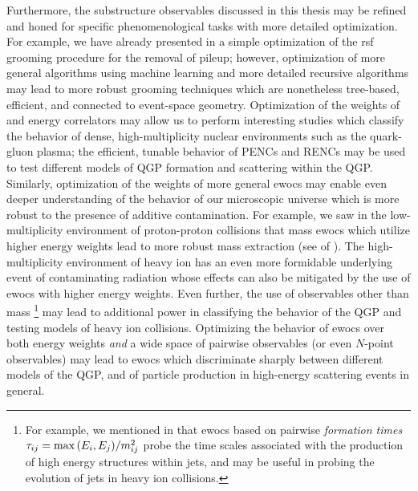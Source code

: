 Furthermore, the substructure observables discussed in this thesis may be refined and honed for specific phenomenological tasks with more detailed optimization.
%
For example, we have already presented in  a simple optimization of the \gls{rsf} \PIRANHA{} grooming procedure for the removal of pileup;
%
however, optimization of more general  algorithms using machine learning and more detailed recursive algorithms may lead to more robust \PIRANHA{} grooming techniques which are nonetheless tree-based, efficient, and connected to event-space geometry.
%
Optimization of the weights of  and  energy correlators may allow us to perform interesting studies which classify the behavior of dense, high-multiplicity nuclear environments such as the quark-gluon plasma;
%
the efficient, tunable behavior of PENCs and RENCs may be used to test different models of QGP formation and scattering within the QGP.
%
Similarly, optimization of the weights of more general \glspl{ewoc} may enable even deeper understanding of the behavior of our microscopic universe which is more robust to the presence of additive contamination.
%
For example, we saw in the low-multiplicity environment of proton-proton collisions that mass \glspl{ewoc} which utilize higher energy weights lead to more robust mass extraction (see  of ).
%
The high-multiplicity environment of heavy ion has an even more formidable underlying event of contaminating radiation whose effects can also be mitigated by the use of \glspl{ewoc} with higher energy weights.
%
Even further, the use of observables other than mass%
\footnote{
    For example, we mentioned in  that \glspl{ewoc} based on pairwise \textit{formation times} \(\tau_{ij} = \max{\left(E_i, E_j\right)} / m^2_{ij}\) probe the time scales associated with the production of high energy structures within jets, and may be useful in probing the evolution of jets in heavy ion collisions.
}
%
may lead to additional power in classifying the behavior of the QGP and testing models of heavy ion collisions.
%
Optimizing the behavior of \glspl{ewoc} over both energy weights \textit{and} a wide space of pairwise observables (or even \(N\)-point observables) may lead to \glspl{ewoc} which discriminate sharply between different models of the QGP, and of particle production in high-energy scattering events in general.



